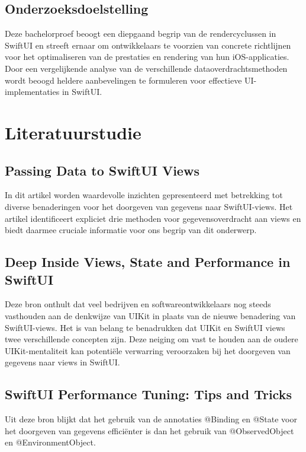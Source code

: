 \subsection{Onderzoeksdoelstelling}
Deze bachelorproef beoogt een diepgaand begrip van de rendercyclussen in SwiftUI en streeft ernaar om ontwikkelaars te voorzien van concrete richtlijnen voor het optimaliseren van de prestaties en rendering van hun iOS-applicaties. Door een vergelijkende analyse van de verschillende dataoverdrachtsmethoden wordt beoogd heldere aanbevelingen te formuleren voor effectieve UI-implementaties in SwiftUI.



\section{Literatuurstudie}%
\label{sec:state-of-the-art}

\subsection{Passing Data to SwiftUI Views~\autocite{SwiftDevJournal}}
In dit artikel worden waardevolle inzichten gepresenteerd met betrekking tot diverse benaderingen voor het doorgeven van gegevens naar SwiftUI-views. Het artikel identificeert expliciet drie methoden voor gegevensoverdracht aan views en biedt daarmee cruciale informatie voor ons begrip van dit onderwerp.

\subsection{Deep Inside Views, State and Performance in SwiftUI~\autocite{Long2020}}
Deze bron onthult dat veel bedrijven en softwareontwikkelaars nog steeds vasthouden aan de denkwijze van UIKit in plaats van de nieuwe benadering van SwiftUI-views. Het is van belang te benadrukken dat UIKit en SwiftUI views twee verschillende concepten zijn. Deze neiging om vast te houden aan de oudere UIKit-mentaliteit kan potentiële verwarring veroorzaken bij het doorgeven van gegevens naar views in SwiftUI.

\subsection{SwiftUI Performance Tuning: Tips and Tricks~\autocite{Amisha2022}}
Uit deze bron blijkt dat het gebruik van de annotaties @Binding en @State voor het doorgeven van gegevens efficiënter is dan het gebruik van @ObservedObject en @EnvironmentObject.



